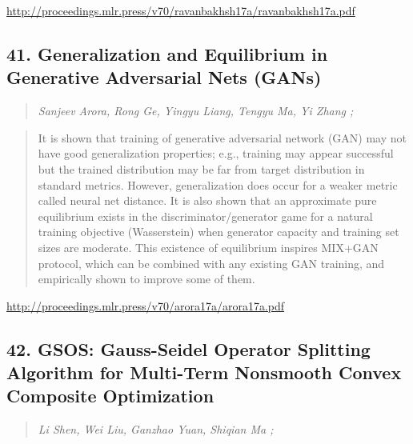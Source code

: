 \documentclass{article}
\begin{document}
\href{http://proceedings.mlr.press/v70/ravanbakhsh17a/ravanbakhsh17a.pdf}{http://proceedings.mlr.press/v70/ravanbakhsh17a/ravanbakhsh17a.pdf}

\subsection{41. Generalization and Equilibrium in Generative Adversarial Nets (GANs)}

\begin{quote}
\footnotesize{\textit{Sanjeev Arora, Rong Ge, Yingyu Liang, Tengyu Ma, Yi Zhang ;}}

\end{quote}

\begin{quote}
    It is shown that training of generative adversarial network (GAN) may not have good generalization properties; e.g., training may appear successful but the trained distribution may be far from target distribution in standard metrics. However, generalization does occur for a weaker metric called neural net distance. It is also shown that an approximate pure equilibrium exists in the discriminator/generator game for a natural training objective (Wasserstein) when generator capacity and training set sizes are moderate. This existence of equilibrium inspires MIX+GAN protocol, which can be combined with any existing GAN training, and empirically shown to improve some of them.  
\end{quote}

\href{http://proceedings.mlr.press/v70/arora17a/arora17a.pdf}{http://proceedings.mlr.press/v70/arora17a/arora17a.pdf}

\subsection{42. GSOS: Gauss-Seidel Operator Splitting Algorithm for Multi-Term Nonsmooth Convex Composite Optimization}

\begin{quote}
\footnotesize{\textit{Li Shen, Wei Liu, Ganzhao Yuan, Shiqian Ma ;}}

\end{quote}
\end{document}
